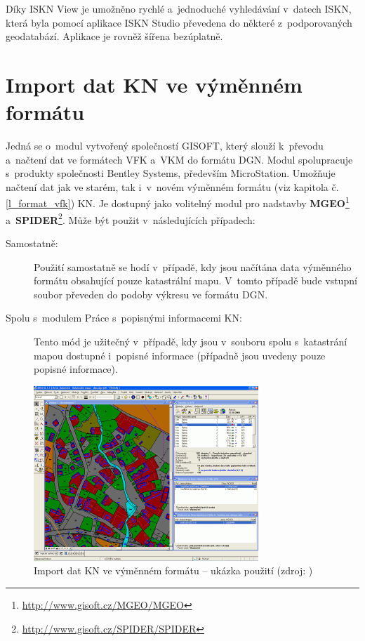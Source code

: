 \documentclass[a4paper,12pt,oneside]{book}
\begin{document}
Díky ISKN View je umožněno rychlé a~jednoduché vyhledávání v~datech
ISKN, která byla pomocí aplikace ISKN Studio převedena do některé
z~podporovaných geodatabází.  Aplikace je rovněž šířena
bezúplatně. \cite{iskn_studio}

\newpage
\section{Import dat KN ve výměnném formátu}
Jedná se o~modul vytvořený společností GISOFT, který slouží k~převodu
a~načtení dat ve formátech VFK a~VKM do formátu DGN. Modul
spolupracuje s~produkty společnosti Bentley Systems, především
MicroStation. Umožňuje načtení dat jak ve starém, tak i~v~novém
výměnném formátu (viz kapitola č. \ref{l_format_vfk}) KN. Je dostupný
jako volitelný modul pro nadstavby
\textbf{MGEO}\footnote{\url{http://www.gisoft.cz/MGEO/MGEO}}
a~\textbf{SPIDER}\footnote{\url{http://www.gisoft.cz/SPIDER/SPIDER}}. Může
být použit v~následujících případech:

\begin{description}
\item[Samostatně:] Použití samostatně se hodí v~případě, kdy jsou
  načítána data výměnného formátu obsahující pouze katastrální
  mapu. V~tomto případě bude vstupní soubor převeden do podoby výkresu
  ve formátu DGN.

\item[Spolu s~modulem Práce s~popisnými informacemi KN:] Tento mód je
  užiteč\-ný v~případě, kdy jsou v~souboru spolu s~katastrání mapou
  dostupné i~popisné informace (případně jsou uvedeny pouze popisné
  informace).
\end{description}

\begin{figure}[htb]
\centering
\includegraphics[scale=1]{images/microstation_modul.png}
\caption[Import dat KN ve výměnném formátu -- ukázka použití]{Import dat KN ve výměnném formátu -- ukázka použití (zdroj: \cite{gisoft_modul})}
\end{figure}
\end{document}
